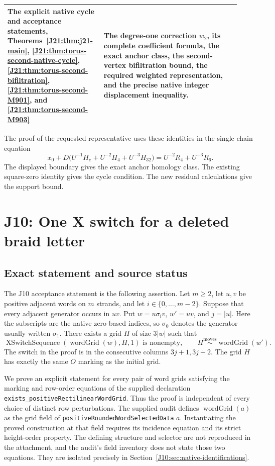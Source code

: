 \documentclass[11pt,oneside]{report}
\theoremstyle{definition}
\numberwithin{equation}{section}
\newcommand{\decl}[1]{\textnormal{\nolinkurl{#1}}}
\newcommand{\Mov}{\mathrel{\stackrel{\mathrm{moves}}{\sim}}}
\begin{document}
\begin{longtable}{@{}>{\raggedright\arraybackslash}p{0.35\linewidth}
>{\raggedright\arraybackslash}p{0.57\linewidth}@{}}
The explicit native cycle and acceptance statements,
Theorems~\ref{J21:thm:j21-main},
\ref{J21:thm:torus-second-native-cycle},
\ref{J21:thm:torus-second-bifiltration},
\ref{J21:thm:torus-second-M901}, and
\ref{J21:thm:torus-second-M903}
&The degree-one correction $w_2$, its complete coefficient formula,
the exact anchor class, the second-vertex bifiltration bound,
the required weighted representation, and the precise native
integer displacement inequality.\\\hline
\end{longtable}
\endgroup

The proof of the requested representative uses these identities in
the single chain equation
\[
 x_0+D\bigl(U^{-1}H_e+U^{-2}H_4+U^{-3}H_{32}\bigr)
                  =U^{-2}R_4+U^{-3}R_6.
\]
The displayed boundary gives the exact anchor homology class.
The existing square-zero identity gives the cycle condition.
The new residual calculations give the support bound.




\chapter{J10: One X switch for a deleted braid letter}
\label{chapter:J10}



\section{Exact statement and source status}

The J10 acceptance statement is the following assertion. Let $m\ge2$,
let $u,v$ be positive adjacent words on $m$ strands, and let
$i\in\{0,\ldots,m-2\}$. Suppose that every adjacent generator occurs
in $u v$. Put $w=u\sigma_i v$, $w'=uv$, and $j=|u|$.
Here the subscripts are the native zero-based indices, so $\sigma_0$
denotes the generator usually written $\sigma_1$.
There exists a grid $H$ of size $3|w|$ such that
\begin{equation}\label{J10:eq:target}
 \operatorname{XSwitchSequence}(\operatorname{wordGrid}(w),H,1)
 \text{ is nonempty},\qquad
 H\Mov\operatorname{wordGrid}(w').
\end{equation}
The switch in the proof is in the consecutive columns $3j+1,3j+2$.
The grid $H$ has exactly the same $O$ marking as the initial grid.

We prove an explicit statement for every pair of word grids satisfying
the marking and row-order equations of the supplied declaration
\decl{exists_positiveRectilinearWordGrid}. Thus the proof is independent
of every choice of distinct row perturbations. The supplied audit defines
$\operatorname{wordGrid}(a)$ as the grid field of
\decl{positiveRoundedWordSelectedData} $a$. Instantiating the
proved construction at that field requires its incidence equation
and its strict height-order property. The defining structure and
selector are not reproduced in the attachment, and the audit's
field inventory does not state those two equations. They are isolated
precisely in Section~\ref{J10:sec:native-identifications}.
\end{document}
